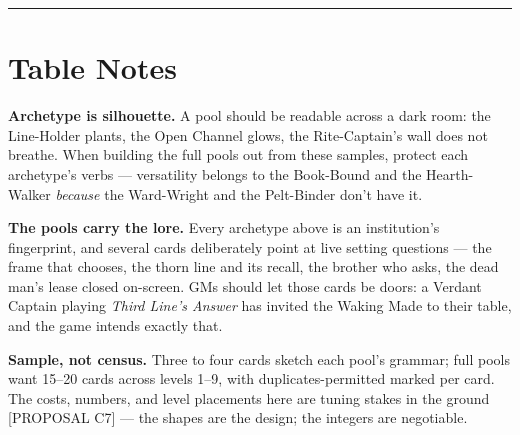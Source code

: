 \medskip\hrule\medskip

\section{Table Notes}

\textbf{Archetype is silhouette.} A pool should be readable across a dark room: the Line-Holder plants, the Open Channel glows, the Rite-Captain's wall does not breathe. When building the full pools out from these samples, protect each archetype's verbs --- versatility belongs to the Book-Bound and the Hearth-Walker \textit{because} the Ward-Wright and the Pelt-Binder don't have it.

\textbf{The pools carry the lore.} Every archetype above is an institution's fingerprint, and several cards deliberately point at live setting questions --- the frame that chooses, the thorn line and its recall, the brother who asks, the dead man's lease closed on-screen. GMs should let those cards be doors: a Verdant Captain playing \textit{Third Line's Answer} has invited the Waking Made to their table, and the game intends exactly that.

\textbf{Sample, not census.} Three to four cards sketch each pool's grammar; full pools want 15--20 cards across levels 1--9, with duplicates-permitted marked per card. The costs, numbers, and level placements here are tuning stakes in the ground [PROPOSAL C7] --- the shapes are the design; the integers are negotiable.
